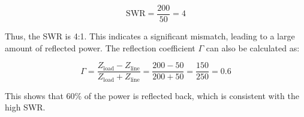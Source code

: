 \[
\text{SWR} = \frac{200}{50} = 4
\]

Thus, the SWR is 4:1. This indicates a significant mismatch, leading to a large amount of reflected power. The reflection coefficient \( \Gamma \) can also be calculated as:

\[
\Gamma = \frac{Z_{\text{load}} - Z_{\text{line}}}{Z_{\text{load}} + Z_{\text{line}}} = \frac{200 - 50}{200 + 50} = \frac{150}{250} = 0.6
\]

This shows that 60\% of the power is reflected back, which is consistent with the high SWR.

